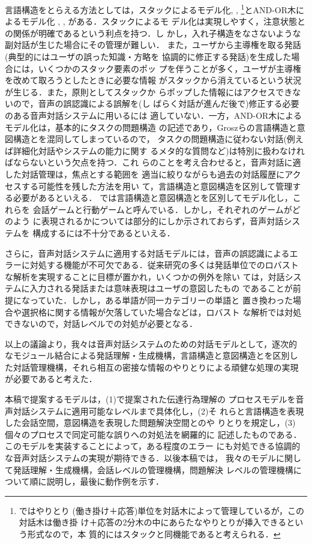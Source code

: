 言語構造をとらえる方法としては，スタックによるモデル化\cite{grosz86},
\cite{allen96}, \cite{jonsson91}\footnote{\cite{jonsson91}ではやりとり
(働き掛け＋応答)単位を対話木によって管理しているが，この対話木は働き掛
け＋応答の2分木の中にあらたなやりとりが挿入できるという形式なので，本
質的にはスタックと同機能であると考えられる．}とAND-OR木によるモデル化
\cite{young89}, \cite{smith94}, \cite{smith95}がある．スタックによるモ
デル化は実現しやすく，注意状態との関係が明確であるという利点を持つ．し
かし，入れ子構造をなさないような副対話が生じた場合にその管理が難しい．
また，ユーザから主導権を取る発話(典型的にはユーザの誤った知識・方略を
協調的に修正する発話)を生成した場合には，いくつかのスタック要素のポッ
プを伴うことが多く，ユーザが主導権を改めて取ろうとしたときに必要な情報
がスタックから消えているという状況が生じる．また，原則としてスタックか
らポップした情報にはアクセスできないので，音声の誤認識による誤解を(し
ばらく対話が進んだ後で)修正する必要のある音声対話システムに用いるには
適していない．一方，AND-OR木によるモデル化は，基本的にタスクの問題構造
の記述であり，Groszらの言語構造と意図構造とを混同してしまっているので，
タスクの問題構造に従わない対話(例えば詳細化対話やシステムの能力に関す
るメタ的な質問など)は特別に扱わなければならないという欠点を持つ．これ
らのことを考え合わせると，音声対話に適した対話管理は，焦点とする範囲を
適当に絞りながらも過去の対話履歴にアクセスする可能性を残した方法を用い
て，言語構造と意図構造を区別して管理する必要があるといえる．
\cite{airenti93}では言語構造と意図構造とを区別してモデル化し，これらを
会話ゲームと行動ゲームと呼んでいる．しかし，それぞれのゲームがどのよう
に表現されるかについては部分的にしか示されておらず，音声対話システムを
構成するには不十分であるといえる．

さらに，音声対話システムに適用する対話モデルには，音声の誤認識によるエ
ラーに対処する機能が不可欠である．従来研究の多くは発話単位でのロバスト
な解析を実現することに目標が置かれ\cite{kawa95}，いくつかの例外を除い
ては，対話システムに入力される発話または意味表現はユーザの意図したもの
であることが前提になっていた．しかし，ある単語が同一カテゴリーの単語と
置き換わった場合や選択格に関する情報が欠落していた場合などは，ロバスト
な解析では対処できないので，対話レベルでの対処が必要となる．

以上の議論より，我々は音声対話システムのための対話モデルとして，逐次的
なモジュール結合による発話理解・生成機構，言語構造と意図構造とを区別し
た対話管理機構，それら相互の密接な情報のやりとりによる頑健な処理の実現
が必要であると考えた．

本稿で提案するモデルは，(1)\cite{airenti93}で提案された伝達行為理解の
プロセスモデルを音声対話システムに適用可能なレベルまで具体化し，(2)そ
れらと言語構造を表現した会話空間，意図構造を表現した問題解決空間とのや
りとりを規定し，(3)個々のプロセスで同定可能な誤りへの対処法を網羅的に
記述したものである．このモデルを実装することによって，ある程度のエラー
にも対処できる協調的な音声対話システムの実現が期待できる．以後本稿では，
我々のモデルに関して発話理解・生成機構，会話レベルの管理機構，問題解決
レベルの管理機構について順に説明し，最後に動作例を示す．

